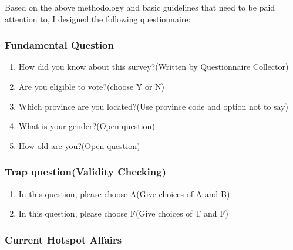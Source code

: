 \documentclass[
]{article}
\begin{document}
Based on the above methodology and basic guidelines that need to be paid
attention to, I designed the following questionnaire:

\hypertarget{fundamental-question}{%
\subsubsection{Fundamental Question}\label{fundamental-question}}

\begin{enumerate}
\def\labelenumi{(\arabic{enumi})}
\item
  How did you know about this survey?(Written by Questionnaire
  Collector)
\item
  Are you eligible to vote?(choose Y or N)
\item
  Which province are you located?(Use province code and option not to
  say)
\item
  What is your gender?(Open question)
\item
  How old are you?(Open question)
\end{enumerate}

\hypertarget{trap-questionvalidity-checking}{%
\subsubsection{Trap question(Validity
Checking)}\label{trap-questionvalidity-checking}}

\begin{enumerate}
\def\labelenumi{(\arabic{enumi})}
\setcounter{enumi}{5}
\item
  In this question, please choose A(Give choices of A and B)
\item
  In this question, please choose F(Give choices of T and F)
\end{enumerate}

\hypertarget{current-hotspot-affairs}{%
\subsubsection{Current Hotspot Affairs}\label{current-hotspot-affairs}}
\end{document}
